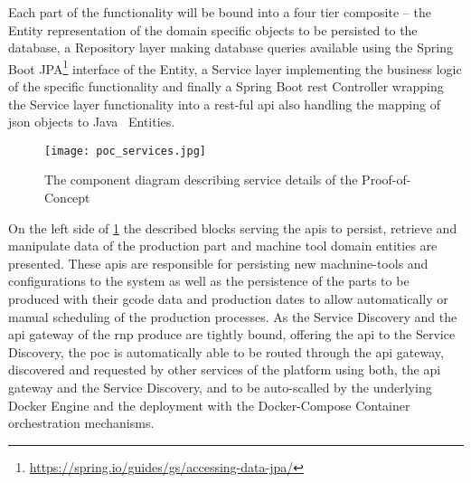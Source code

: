 \documentclass[
a4paper,
twoside,
headsepline,
cleardoublepage=empty,
parskip=half,
draft=false
]{scrbook}
\begin{document}
				Each part of the functionality will be bound into a four tier composite -- the Entity representation of the domain specific objects to be persisted to the database, a Repository layer making database queries available using the Spring Boot JPA\footnote{\url{https://spring.io/guides/gs/accessing-data-jpa/}} interface of the Entity, a Service layer implementing the business logic of the specific functionality and finally a Spring Boot \gls{rest} Controller wrapping the Service layer functionality into a \gls{rest}-ful \gls{api} also handling the mapping of \gls{json} objects to Java~\cite{java2015} Entities.

				\begin{figure}[htbp]
					\centering
					\texttt{[image: poc\_services.jpg]}
					\caption{The component diagram describing service details of the Proof-of-Concept}
					\label{fig:poc_service_diagram}
				\end{figure}

				On the left side of \cref{fig:poc_service_diagram} the described blocks serving the \gls{api}s to persist, retrieve and manipulate data of the production part and machine tool domain entities are presented. These \gls{api}s are responsible for persisting new machnine-tools and configurations to the system as well as the persistence of the parts to be produced with their \gls{gcode} data and production dates to allow automatically or manual scheduling of the production processes. As the Service Discovery and the \gls{api} gateway of the \gls{rnp} produce are tightly bound, offering the \gls{api} to the Service Discovery, the \gls{poc} is automatically able to be routed through the \gls{api} gateway, discovered and requested by other services of the platform using both, the \gls{api} gateway and the Service Discovery, and to be auto-scalled by the underlying Docker Engine and the deployment with the Docker-Compose Container orchestration mechanisms.
\end{document}
